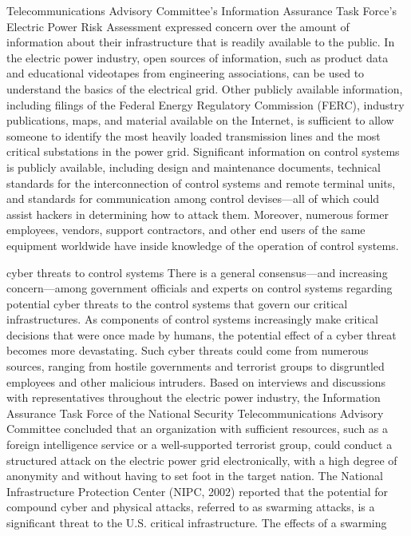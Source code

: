\documentclass{article}
\begin{document}
Telecommunications Advisory Committee's Information Assurance Task
Force's Electric Power Risk Assessment expressed concern over the amount
of information about their infrastructure that is readily available to
the public. In the electric power industry, open sources of information,
such as product data and educational videotapes from engineering
associations, can be used to understand the basics of the electrical
grid. Other publicly available information, including filings of the
Federal Energy Regulatory Commission (FERC), industry publications,
maps, and material available on the Internet, is sufficient to allow
someone to identify the most heavily loaded transmission lines and the
most critical substations in the power grid. Significant information on
control systems is publicly available, including design and maintenance
documents, technical standards for the interconnection of control
systems and remote terminal units, and standards for communication among
control devises---all of which could assist hackers in determining how
to attack them. Moreover, numerous former employees, vendors, support
contractors, and other end users of the same equipment worldwide have
inside knowledge of the operation of control systems.

cyber threats to control systems There is a general consensus---and
increasing concern---among government officials and experts on control
systems regarding potential cyber threats to the control systems that
govern our critical infrastructures. As components of control systems
increasingly make critical decisions that were once made by humans, the
potential effect of a cyber threat becomes more devastating. Such cyber
threats could come from numerous sources, ranging from hostile
governments and terrorist groups to disgruntled employees and other
malicious intruders. Based on interviews and discussions with
representatives throughout the electric power industry, the Information
Assurance Task Force of the National Security Telecommunications
Advisory Committee concluded that an organization with sufficient
resources, such as a foreign intelligence service or a well-supported
terrorist group, could conduct a structured attack on the electric power
grid electronically, with a high degree of anonymity and without having
to set foot in the target nation. The National Infrastructure Protection
Center (NIPC, 2002) reported that the potential for compound cyber and
physical attacks, referred to as swarming attacks, is a significant
threat to the U.S. critical infrastructure. The effects of a swarming
\end{document}
